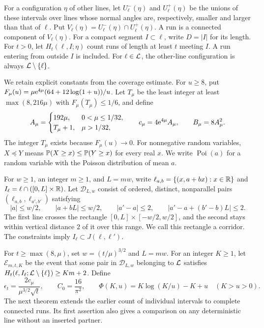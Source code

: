 \documentclass[11pt,letterpaper]{article}
\begin{document}
For a configuration $\eta$ of other lines, let $U_\ell^-(\eta)$ and $U_\ell^+(\eta)$ be the unions of these intervals over lines whose normal angles are, respectively, smaller and larger than that of $\ell$. Put $V_\ell(\eta)=U_\ell^-(\eta)\cap U_\ell^+(\eta)$. A run is a connected component of $V_\ell(\eta)$. For a compact segment $I\subset\ell$, write $D=|I|$ for its length. For $t>0$, let $H_t(\ell,I;\eta)$ count runs of length at least $t$ meeting $I$. A run entering from outside $I$ is included. For $\ell\in\cL$, the other-line configuration is always $\cL\setminus\{\ell\}$.

We retain explicit constants from the coverage estimate. For $u\ge8$, put $F_\mu(u)=\mu\e^{4\mu}(64+12\log(1+u))/u$. Let $T_\mu$ be the least integer at least $\max(8,216\mu)$ with $F_\mu(T_\mu)\le1/6$, and define
\[
 A_\mu=\begin{cases}192\mu,&0<\mu\le1/32,\\T_\mu+1,&\mu>1/32,\end{cases}
 \qquad c_\mu=4\e^{4\mu}A_\mu,\qquad B_\mu=8A_\mu^2.
\]
The integer $T_\mu$ exists because $F_\mu(u)\to0$. For nonnegative random variables, $X\preceq Y$ means $\P(X\ge x)\le\P(Y\ge x)$ for every real $x$. We write $\operatorname{Poi}(a)$ for a random variable with the Poisson distribution of mean $a$.

For $w\ge1$, an integer $m\ge1$, and $L=mw$, write $\ell_{a,b}=\{(x,a+bx):x\in\R\}$ and $I_\ell=\ell\cap([0,L]\times\R)$. Let $\mathcal D_{L,w}$ consist of ordered, distinct, nonparallel pairs $(\ell_{a,b},\ell_{a',b'})$ satisfying
\begin{equation}\label{eq:pairs}
 |a|\le w/2,\qquad |a+bL|\le w/2,\qquad
 |a'-a|\le2,\qquad |a'-a+(b'-b)L|\le2.
\end{equation}
The first line crosses the rectangle $[0,L]\times[-w/2,w/2]$, and the second stays within vertical distance $2$ of it over this range. We call this rectangle a corridor. The constraints imply $I_\ell\subset J(\ell,\ell')$.

For $t\ge\max(8,\mu)$, set $w=(t/\mu)^{3/2}$ and $L=mw$. For an integer $K\ge1$, let $\mathcal E_{m,t,K}$ be the event that some pair in $\mathcal D_{L,w}$ belonging to $\cL$ satisfies $H_t(\ell,I_\ell;\cL\setminus\{\ell\})\ge Km+2$. Define
\[
 \epsilon_t=\frac{2c_\mu}{\mu^{3/2}\sqrt t},\qquad C_0=\frac{16}{\pi^2},\qquad
 \Phi(K,u)=K\log(K/u)-K+u\quad(K>u>0).
\]
The next theorem extends the earlier count of individual intervals to complete connected runs. Its first assertion also gives a comparison on any deterministic line without an inserted partner.
\end{document}
